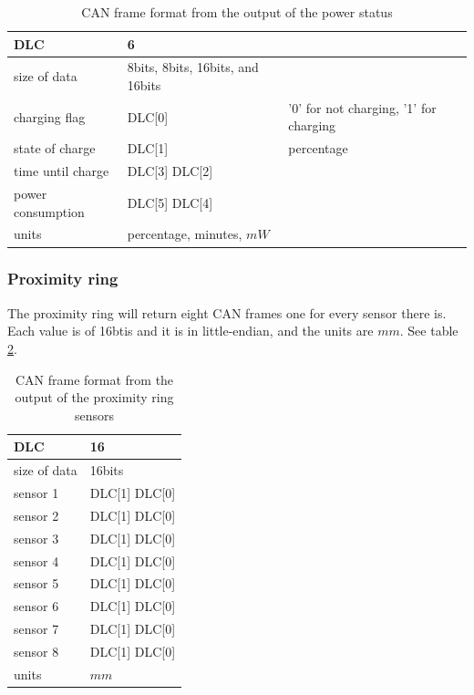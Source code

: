 \documentclass[12pt]{report}%
\begin{document}
\begin{table}[h!]
\centering
\begin{tabular}{|l|l|l|}
	\hline
	DLC										&	6																	&																					\\	\hline
	size of data					&	8bits, 8bits, 16bits, and 16bits	&																					\\	\hline
	charging flag					&	DLC[0]														& '0' for not charging, '1' for charging	\\	\hline
	state of charge				&	DLC[1] 														&	percentage															\\	\hline
	time until charge			&	DLC[3] DLC[2] 										&																					\\	\hline
	power consumption			&	DLC[5] DLC[4] 										&																					\\	\hline
	units									&	percentage, minutes, $mW$					&																					\\	\hline
\end{tabular}
\caption{\label{tab:powerstatus} CAN frame format from the output of the power status}
\end{table}

\subsubsection{Proximity ring}
The proximity ring will return eight CAN frames one for every sensor there is. Each value is of 16btis and it is in little-endian, and the units are $mm$. See table \ref{tab:proxring}.

\begin{table}[h!]
\centering
\begin{tabular}{|l|l|}
	\hline
	DLC						&	16												\\	\hline
	size of data	&	16bits										\\	\hline
	sensor 1			&	DLC[1] DLC[0]							\\	\hline
  sensor 2			&	DLC[1] DLC[0]							\\	\hline
	sensor 3			&	DLC[1] DLC[0]							\\	\hline
	sensor 4			&	DLC[1] DLC[0]							\\	\hline
	sensor 5			&	DLC[1] DLC[0]							\\	\hline
  sensor 6			&	DLC[1] DLC[0]							\\	\hline
	sensor 7			&	DLC[1] DLC[0]							\\	\hline
	sensor 8			&	DLC[1] DLC[0]							\\	\hline
	units					&	$mm$											\\	\hline
\end{tabular}
\caption{\label{tab:proxring} CAN frame format from the output of the proximity ring sensors}
\end{table}
\end{document}
